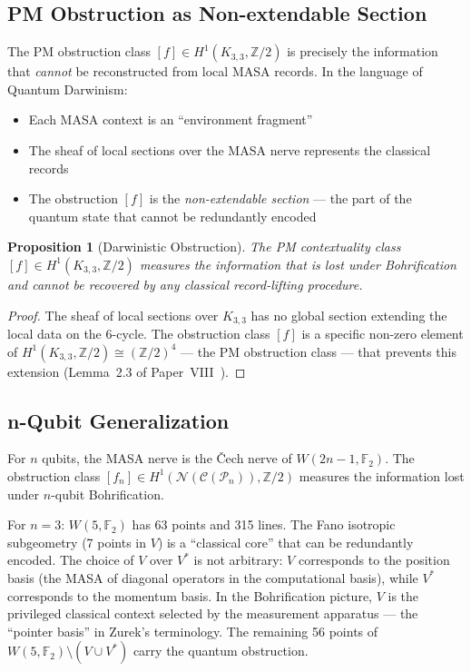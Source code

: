 \documentclass[11pt,a4paper]{article}
\newtheorem{proposition}[theorem]{Proposition}
\theoremstyle{remark}
\newcommand{\Z}{\mathbb{Z}}
\newcommand{\F}{\mathbb{F}}
\begin{document}
\subsection{PM Obstruction as Non-extendable Section}

The PM obstruction class $[f] \in H^1(K_{3,3}, \Z/2)$ is precisely the
information that \emph{cannot} be reconstructed from local MASA records.
In the language of Quantum Darwinism:

\begin{itemize}
  \item Each MASA context is an ``environment fragment''
  \item The sheaf of local sections over the MASA nerve represents the
    classical records
  \item The obstruction $[f]$ is the \emph{non-extendable section} ---
    the part of the quantum state that cannot be redundantly encoded
\end{itemize}

\begin{proposition}[Darwinistic Obstruction]
\label{prop:darwinism}
The PM contextuality class $[f] \in H^1(K_{3,3}, \Z/2)$ measures the
information that is lost under Bohrification and cannot be recovered by
any classical record-lifting procedure.
\end{proposition}

\begin{proof}
The sheaf of local sections over $K_{3,3}$ has no global section
extending the local data on the 6-cycle. The obstruction class $[f]$
is a specific non-zero element of
$H^1(K_{3,3}, \Z/2) \cong (\Z/2)^4$ --- the PM obstruction class ---
that prevents this extension (Lemma~2.3 of Paper~VIII~\cite{PaperVIII}).
\qedhere
\end{proof}

\subsection{n-Qubit Generalization}

For $n$ qubits, the MASA nerve is the \v{C}ech nerve of
$W(2n-1, \F_2)$. The obstruction class
$[f_n] \in H^1(\mathcal{N}(\mathcal{C}(\mathcal{P}_n)), \Z/2)$ measures
the information lost under $n$-qubit Bohrification.

For $n=3$: $W(5, \F_2)$ has 63 points and 315 lines. The Fano isotropic
subgeometry (7 points in $V$) is a ``classical core'' that can be
redundantly encoded. The choice of $V$ over $V^*$ is not arbitrary: $V$
corresponds to the position basis (the MASA of diagonal operators in the
computational basis), while $V^*$ corresponds to the momentum basis. In
the Bohrification picture, $V$ is the privileged classical context
selected by the measurement apparatus --- the ``pointer basis'' in
Zurek's terminology. The remaining 56 points of
$W(5, \F_2) \setminus (V \cup V^*)$ carry the quantum obstruction.
\end{document}
